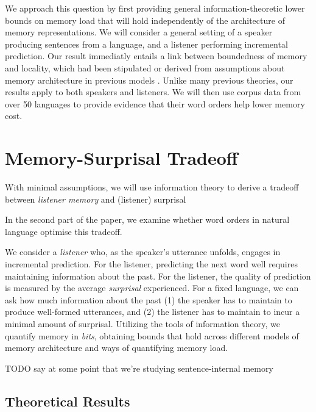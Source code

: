 \documentclass[11pt,letterpaper]{article}
\begin{document}
We approach this question by first providing general information-theoretic lower bounds on memory load that will hold independently of the architecture of memory representations.
We will consider a general setting of a speaker producing sentences from a language, and a listener performing incremental prediction.
Our result immediatly entails a link between boundedness of memory and locality, which had been stipulated or derived from assumptions about memory architecture in previous models \citep{gibson-linguistic-1998, lewis-activation-based-2005, futrell-noisy-context-2017}.
Unlike many previous theories, our results apply to both speakers and listeners.
We will then use corpus data from over 50 languages to provide evidence that their word orders help lower memory cost.


\section{Memory-Surprisal Tradeoff}

With minimal assumptions, we will use information theory to derive a tradeoff between \emph{listener memory} and (listener) surprisal

In the second part of the paper, we examine whether word orders in natural language optimise this tradeoff.



We consider a \emph{listener} who, as the speaker's utterance unfolds, engages in incremental prediction.
For the listener, predicting the next word well requires maintaining information about the past.
For the listener, the quality of prediction is measured by the average \emph{surprisal} experienced.
For a fixed language, we can ask how much information about the past (1) the speaker has to maintain to produce well-formed utterances, and (2) the listener has to maintain to incur a minimal amount of surprisal.
Utilizing the tools of information theory, we quantify memory in \emph{bits}, obtaining bounds that hold across different models of memory architecture and ways of quantifying memory load.


TODO say at some point that we're studying sentence-internal memory

\subsection{Theoretical Results}
\end{document}
